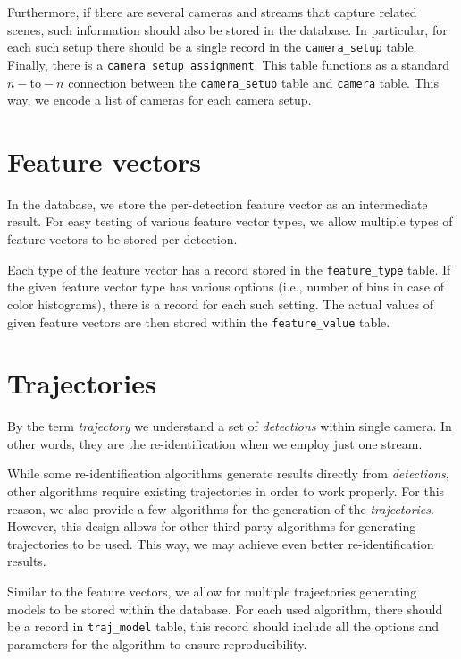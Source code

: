 Furthermore, if there are several cameras and streams that capture related scenes, such information should also be
stored in the database. In particular, for each such setup there should be a single record in the \texttt{camera\_setup}
table. Finally, there is a \texttt{camera\_setup\_assignment}. This table functions as a standard $n-\mathrm{to}-n$ connection between the \texttt{camera\_setup} table and \texttt{camera} table. This way, we encode a list of cameras for each camera setup.


\section{Feature vectors}
  
In the database, we store the per-detection feature vector as an intermediate
result. For easy testing of various feature vector types, we allow multiple
types of feature vectors to be stored per detection.

Each type of the feature vector has a record stored in the \texttt{feature\_type}
table. If the given feature vector type has various options (i.e., number of bins in
case of color histograms), there is a record for each such setting. The actual
values of given feature vectors are then stored within the \texttt{feature\_value}
table.

\section{Trajectories}

By the term \emph{trajectory} we understand a set of \emph{detections} within
single camera. In other words, they are the re-identification when we employ just
one stream.

While some re-identification algorithms generate results directly from \emph{detections},
other algorithms require existing trajectories in order to
work properly. For this reason, we also provide a few algorithms for the generation
of the \emph{trajectories}. However, this design allows for other third-party
algorithms for generating trajectories to be used. This way, we may achieve
even better re-identification results.

Similar to the feature vectors, we allow for multiple trajectories generating
models to be stored within the database. For each used algorithm, there should
be a record in \texttt{traj\_model} table, this record should include all the options
and parameters for the algorithm to ensure reproducibility.

